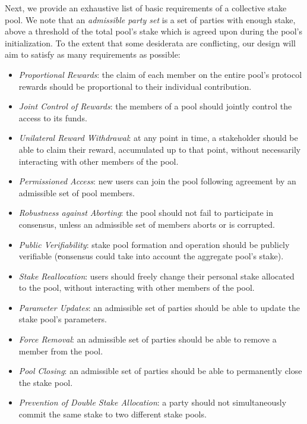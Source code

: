 Next, we provide an exhaustive list of basic requirements of a collective stake
pool. We note that an \emph{admissible party set} is a set of parties with
enough stake, \ie above a threshold of the total pool's stake which is agreed
upon during the pool's initialization. To the extent that some desiderata are
conflicting, our design will aim to satisfy as many requirements as possible:
\begin{itemize}[noitemsep]
    \item \emph{Proportional Rewards}: the claim of each member on the
        entire pool's protocol rewards should be proportional to
        their individual contribution.

    \item \emph{Joint Control of Rewards}: the members of a pool should
        jointly control the access to its funds.

    \item \emph{Unilateral Reward Withdrawal}: at any point in time, a
        stakeholder should be able to claim their reward,
        accumulated up to that point, without necessarily interacting with
        other members of the pool.

    \item \emph{Permissioned Access}: new users can join the pool following
        agreement by an admissible set of pool members.

    \item \emph{Robustness against Aborting}: the pool should not fail to
        participate in consensus, unless an admissible set of members aborts or
        is corrupted.

    \item \emph{Public Verifiability}: stake pool formation and operation
        should be publicly verifiable (\st consensus could take into account
        the aggregate pool's stake).

    \item \emph{Stake Reallocation}: users should freely change their
        personal stake allocated to the pool, without interacting with other
        members of the pool.

    \item \emph{Parameter Updates}: an admissible set of parties should be
        able to update the stake pool's parameters.

    \item \emph{Force Removal}: an admissible set of parties should be able
        to remove a member from the pool.

    \item \emph{Pool Closing}: an admissible set of parties should be able to
        permanently close the stake pool.

    \item \emph{Prevention of Double Stake Allocation}: a party should not
        simultaneously commit the same stake to two different stake pools.
\end{itemize}

